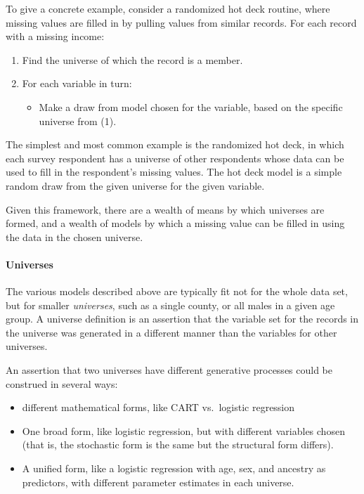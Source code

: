 \documentclass{article}
\def\tighten{ \setlength{\itemsep}{1pt}
    \setlength{\parskip}{0pt}}
\begin{document}
To give a concrete example, consider a randomized hot deck routine, where missing values are
filled in by pulling values from similar records. For each record with a missing income:
\begin{enumerate}
\tighten
\item Find the universe of which the record is a member.
\item For each variable in turn:
    \begin{itemize}
    \item Make a draw from model chosen for the variable, based on the specific universe from (1).
    \end{itemize}
\end{enumerate}


The simplest and most common example is the randomized hot deck, in which each survey respondent 
has a universe of other respondents whose data can be used to fill in the respondent's missing
values. The hot deck model is a simple random draw from the given universe for the given variable.

Given this framework, there are a wealth of means by which universes are formed, and
a wealth of models by which a missing value can be filled in using the data in the chosen universe.

\paragraph{Universes}
The various models described above are typically fit not for the whole data set, but for
smaller {\em universes}, such as a single county, or all males in a given age group.
A universe definition is an assertion that the variable set for the records in the
universe was generated in a different manner than the variables for other universes.

An assertion that two universes have different generative processes could be construed in
several ways:

\begin{itemize}\tighten
\item different mathematical forms, like CART vs.\ logistic regression
\item One broad form, like logistic regression, but with different variables chosen
    (that is, the stochastic form is the same but the structural form differs).
\item A unified form, like a logistic regression with age, sex, and ancestry
    as predictors, with different parameter estimates in each universe.
\end{itemize}
\end{document}
